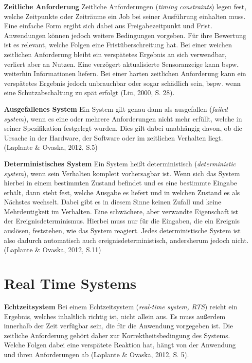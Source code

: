 \textbf{Zeitliche Anforderung} Zeitliche Anforderungen (\emph{timing} \emph{constraints}) legen fest, welche Zeitpunkte oder Zeitr{\"a}ume ein Job bei seiner Ausf{\"u}hrung einhalten muss. Eine einfache Form ergibt sich dabei aus Freigabezeitpunkt und Frist. Anwendungen k{\"o}nnen jedoch weitere Bedingungen vorgeben. F{\"u}r ihre Bewertung ist es relevant, welche Folgen eine Frist{\"u}berschreitung hat. Bei einer weichen zeitlichen Anforderung bleibt ein versp{\"a}tetes Ergebnis an sich verwendbar, verliert aber an Nutzen. Eine verz{\"o}gert aktualisierte Sensoranzeige kann bspw. weiterhin Informationen liefern. Bei einer harten zeitlichen Anforderung kann ein versp{\"a}tetes Ergebnis jedoch unbrauchbar oder sogar sch{\"a}dlich sein, bspw. wenn eine Schutzabschaltung zu sp{\"a}t erfolgt (Liu, 2000, S. 28).

\textbf{Ausgefallenes System} Ein System gilt genau dann als ausgefallen (\emph{failed} \emph{system}), wenn es eine oder mehrere Anforderungen nicht mehr erf{\"u}llt, welche in seiner Spezifikation festgelegt wurden. Dies gilt dabei unabh{\"a}ngig davon, ob die Ursache in der Hardware, der Software oder im zeitlichen Verhalten liegt. (Laplante \& Ovaska, 2012, S.5)

\textbf{Deterministisches System }Ein System hei{\ss}t deterministisch (\emph{deterministic} \emph{system}), wenn sein Verhalten komplett vorhersagbar ist. Wenn sich das System hierbei in einem bestimmten Zustand befindet und es eine bestimmte Eingabe erh{\"a}lt, dann steht fest, welche Ausgabe es liefert und in welchen Zustand es als N{\"a}chstes wechselt. Dabei gibt es in diesem Sinne keinen Zufall und keine Mehrdeutigkeit im Verhalten. Eine schw{\"a}chere, aber verwandte Eigenschaft ist der Ereignisdeterminismus. Hierbei muss nur f{\"u}r die Eingaben, die ein Ereignis ausl{\"o}sen, feststehen, wie das System reagiert. Jedes deterministische System ist also dadurch automatisch auch ereignisdeterministisch, andersherum jedoch nicht. (Laplante \& Ovaska, 2012, S.11)

\section{Real Time Systems}
\textbf{Echtzeitsystem} Bei einem Echtzeitsystem (\emph{real-time system, RTS}) reicht ein Ergebnis, welches inhaltlich richtig ist, nicht allein aus. Es muss au{\ss}erdem innerhalb der Zeit verf{\"u}gbar sein, die f{\"u}r die Anwendung vorgegeben ist. Die zeitliche Anforderung geh{\"o}rt daher zur Korrektheitsbedingung des Systems. Welche Folgen dabei eine versp{\"a}tete Reaktion hat, h{\"a}ngt von der Anwendung und ihren Anforderungen ab (Laplante \& Ovaska, 2012, S. 5).

